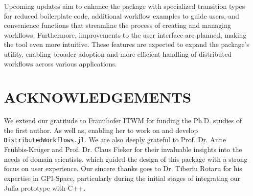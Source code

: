 \documentclass{juliacon}
\begin{document}
Upcoming updates aim to enhance the package with specialized transition types for reduced boilerplate code, additional workflow examples to guide users, and convenience functions that streamline the process of creating and managing workflows. 
Furthermore, improvements to the user interface are planned, making the tool even more intuitive. 
These features are expected to expand the package's utility, enabling broader adoption and more efficient handling of distributed workflows across various applications.


\section{ACKNOWLEDGEMENTS}
\label{sec:acknowledgements}

We extend our gratitude to Fraunhofer ITWM for funding the Ph.D. studies of the first author. 
As well as, enabling her to work on and develop \texttt{DistributedWorkflows.jl}. 
We are also deeply grateful to Prof. Dr. Anne Fr\"uhbis-Kr\"uger and Prof. Dr. Claus Fieker for their invaluable insights into the needs of domain scientists, which guided the design of this package with a strong focus on user experience. 
Our sincere thanks goes to Dr. Tiberiu Rotaru for his expertise in GPI-Space, particularly during the initial stages of integrating our Julia prototype with C++.


\end{document}
